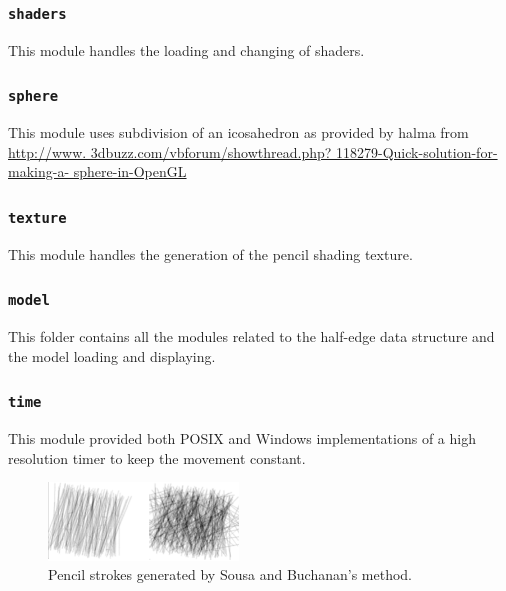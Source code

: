     \subsubsection{\texttt{shaders}}

      This module handles the loading and changing of shaders.

    \subsubsection{\texttt{sphere}}

      This module uses subdivision of an icosahedron as provided by halma from
      \href{http://www.3dbuzz.com/vbforum/showthread.php?118279-Quick-solution-for-making-a-sphere-in-OpenGL}
      {http://www.
      3dbuzz.com/vbforum/showthread.php?
      118279-Quick-solution-for-making-a-
      sphere-in-OpenGL}

    \subsubsection{\texttt{texture}}

      This module handles the generation of the pencil shading texture.

    \subsubsection{\texttt{model}}

      This folder contains all the modules related to the half-edge data
      structure and the model loading and displaying.

    \subsubsection{\texttt{time}}

      This module provided both POSIX and Windows implementations of a high
      resolution timer to keep the movement constant.

    \begin{figure}
      \centering
      \includegraphics[width=0.45\textwidth]{images/graphite}
      \caption{Pencil strokes generated by Sousa and Buchanan's method.}
      \label{graphite}
    \end{figure}

